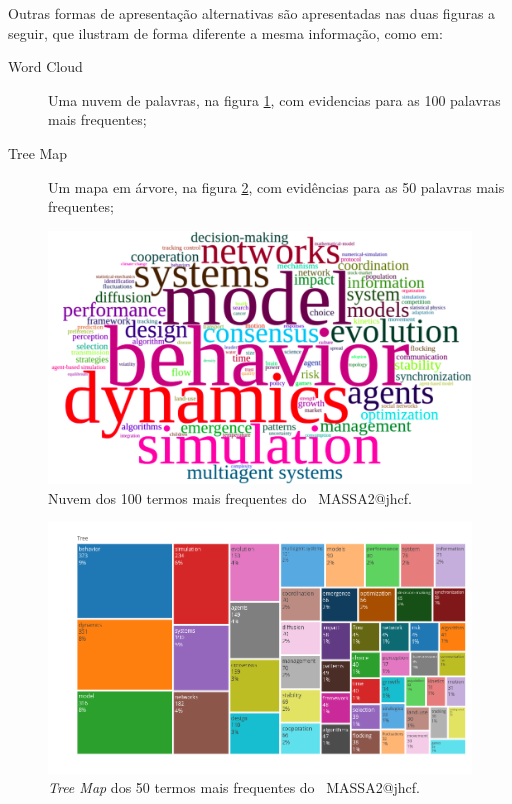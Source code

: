 Outras formas de apresentação alternativas são apresentadas nas duas figuras a seguir, que ilustram de forma diferente a mesma informação, como em:
\begin{description}
    \item [Word Cloud] Uma nuvem de palavras, na figura \ref{fig:MASSA2-WordCloud-100words}, com evidencias para as 100 palavras mais frequentes;
    \item [Tree Map] Um mapa em árvore, na figura \ref{fig:MASSA2-TreeMap}, com evidências para as 50 palavras mais frequentes;
\end{description}

\begin{figure}
    \centering
    \includegraphics[width=1\textwidth]{experiments/jhcf/PesqBibliogr/SimulacaoMultiagente/WoS-20220203/Metricas/Documentos/MASSA2-WordCloud-100words.png}
    \caption{Nuvem dos 100 termos mais frequentes do \dataset\ MASSA2@jhcf.}
    \label{fig:MASSA2-WordCloud-100words}
\end{figure}

\begin{figure}
    \centering
    \includegraphics[width=1\textwidth]{experiments/jhcf/PesqBibliogr/SimulacaoMultiagente/WoS-20220203/Metricas/Documentos/MASSA2-TreeMap.png}
    \caption{\textit{Tree Map} dos 50 termos mais frequentes do \dataset\ MASSA2@jhcf.}
    \label{fig:MASSA2-TreeMap}
\end{figure}

